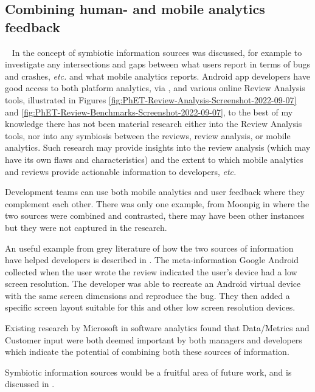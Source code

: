 \subsection{Combining human- and mobile analytics feedback}~\label{fw-combining-reviews-and-mobile-analytics-topic}
In  the concept of symbiotic information sources was discussed, for example to investigate any intersections and gaps between what users report in terms of bugs and crashes, \emph{etc.} and what mobile analytics reports. Android app developers have good access to both platform analytics, via , and various online Review Analysis tools, illustrated in Figures \ref{fig:PhET-Review-Analysis-Screenshot-2022-09-07} and \ref{fig:PhET-Review-Benchmarks-Screenshot-2022-09-07}, to the best of my knowledge there has not been material research either into the Review Analysis tools, nor into any symbiosis between the reviews, review analysis, or mobile analytics. Such research may provide insights into the review analysis (which may have its own flaws and characteristics) and the extent to which mobile analytics and reviews provide actionable information to developers, \emph{etc.}

Development teams can use both mobile analytics and user feedback where they complement each other. There was only one example, from Moonpig in  where the two sources were combined and contrasted, there may have been other instances but they were not captured in the research. 

An useful example from grey literature of how the two sources of information have helped developers is described in . The meta-information Google Android collected when the user wrote the review indicated the user's device had a low screen resolution. The developer was able to recreate an Android virtual device with the same screen dimensions and reproduce the bug. They then added a specific screen layout suitable for this and other low screen resolution devices.

Existing research by Microsoft in software analytics found that Data/Metrics and Customer input were both deemed important by both managers and developers which indicate the potential of combining both these sources of information.~

Symbiotic information sources would be a fruitful area of future work, and is discussed in .


